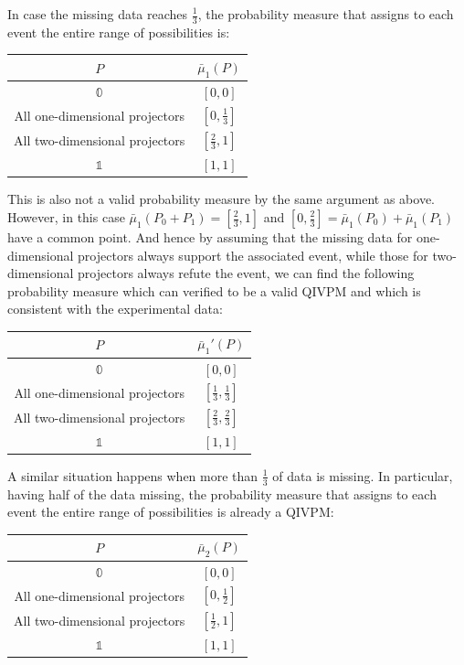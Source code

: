 \documentclass[english,reprint, aps, prl,superscriptaddress, showpacs,
showkeys, longbibliography, amsmath, amssymb, floatfix]{revtex4-1}
\theoremstyle{plain}
\theoremstyle{definition}
\newcommand{\imposs}{\ensuremath{\left[0,0\right]}}
\newcommand{\necess}{\ensuremath{\left[1,1\right]}}
\begin{document}
In case the missing data reaches $\frac{1}{3}$, the probability measure
that assigns to each event the entire range of possibilities is: 
\begin{center}
\begin{tabular}{cc}
\toprule 
\addlinespace
$P$  & $\bar{\mu}_{1}\left(P\right)$\tabularnewline
\midrule
\midrule 
\addlinespace
$\mathbb{0}$  & $\imposs$\tabularnewline
\midrule 
\addlinespace
All one-dimensional projectors  & $\left[0,\tfrac{1}{3}\right]$\tabularnewline
\midrule 
\addlinespace
All two-dimensional projectors  & $\left[\tfrac{2}{3},1\right]$\tabularnewline
\midrule 
\addlinespace
$\mathbb{1}$  & $\necess$\tabularnewline
\bottomrule
\end{tabular}
\par\end{center}

\noindent This is also not a valid probability measure by the same
argument as above. However, in this case $\bar{\mu}_{1}\left(P_{0}+P_{1}\right)=\left[\tfrac{2}{3},1\right]$
and $\left[0,\tfrac{2}{3}\right]=\bar{\mu}_{1}\left(P_{0}\right)+\bar{\mu}_{1}\left(P_{1}\right)$
have a common point. And hence by assuming that the missing data for
one-dimensional projectors always support the associated event, while
those for two-dimensional projectors always refute the event, we can
find the following probability measure which can verified to be a
valid QIVPM and which is consistent with the experimental data: 
\begin{center}
\begin{tabular}{cc}
\toprule 
\addlinespace
$P$  & $\bar{\mu}_{1}'\left(P\right)$\tabularnewline
\midrule
\midrule 
\addlinespace
$\mathbb{0}$  & $\imposs$\tabularnewline
\midrule 
\addlinespace
All one-dimensional projectors  & $\left[\tfrac{1}{3},\tfrac{1}{3}\right]$\tabularnewline
\midrule 
\addlinespace
All two-dimensional projectors  & $\left[\tfrac{2}{3},\tfrac{2}{3}\right]$\tabularnewline
\midrule 
\addlinespace
$\mathbb{1}$  & $\necess$\tabularnewline
\bottomrule
\end{tabular}
\par\end{center}

A similar situation happens when more than $\frac{1}{3}$ of data
is missing. In particular, having half of the data missing, the probability
measure that assigns to each event the entire range of possibilities
is already a QIVPM:
\begin{center}
\begin{tabular}{cc}
\toprule 
\addlinespace
$P$  & $\bar{\mu}_{2}\left(P\right)$\tabularnewline
\midrule
\midrule 
\addlinespace
$\mathbb{0}$  & $\imposs$\tabularnewline
\midrule 
\addlinespace
All one-dimensional projectors  & $\left[0,\tfrac{1}{2}\right]$\tabularnewline
\midrule 
\addlinespace
All two-dimensional projectors  & $\left[\tfrac{1}{2},1\right]$\tabularnewline
\midrule 
\addlinespace
$\mathbb{1}$  & $\necess$\tabularnewline
\bottomrule
\end{tabular}
\par\end{center}
\end{document}
